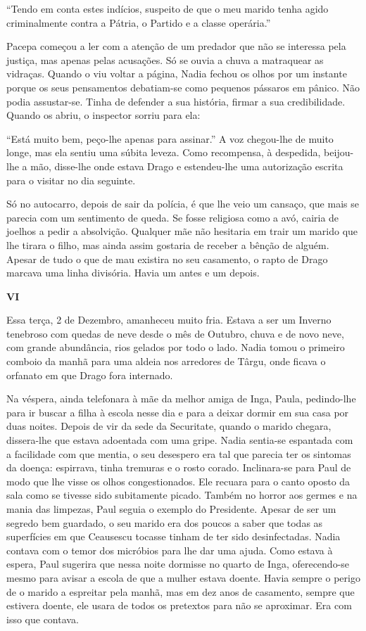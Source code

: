 ``Tendo em conta estes indícios, suspeito de que o meu marido tenha agido
criminalmente contra a Pátria, o Partido e a classe operária.''

Pacepa começou a ler com a atenção de um predador que não se interessa
pela justiça, mas apenas pelas acusações. Só se ouvia a chuva a
matraquear as vidraças. Quando o viu voltar a página, Nadia fechou os
olhos por um instante porque os seus pensamentos debatiam-se como
pequenos pássaros em pânico. Não podia assustar-se. Tinha de defender a sua história, firmar a sua credibilidade.
Quando os abriu, o inspector sorriu para ela:

``Está muito bem, peço-lhe apenas para assinar.'' A voz chegou-lhe de
muito longe, mas ela sentiu uma súbita leveza. Como recompensa, à
despedida, beijou-lhe a mão, disse-lhe onde estava Drago e estendeu-lhe
uma autorização escrita para o visitar no dia seguinte.

Só no autocarro, depois de sair da polícia, é que lhe veio um cansaço,
que mais se parecia com um sentimento de queda. Se fosse religiosa como
a avó, cairia de joelhos
a pedir a absolvição. Qualquer mãe não hesitaria em trair um marido que
lhe tirara o filho, mas ainda assim gostaria de receber a bênção de
alguém. Apesar de tudo o que de mau existira no seu casamento, o rapto
de Drago marcava uma linha divisória. Havia um antes e um depois.

\pagebreak
\vspace*{1.8cm}
\noindent{}\textbf{VI}

\bigskip

Essa terça, 2 de Dezembro, amanheceu muito fria. Estava a ser um Inverno
tenebroso com quedas de neve desde o mês de Outubro, chuva e de novo
neve, com grande abundância, rios gelados por todo o lado. Nadia tomou o
primeiro comboio da manhã para uma aldeia nos arredores de Târgu, onde
ficava o orfanato em que Drago fora internado.

Na véspera, ainda telefonara à mãe da melhor amiga de Inga, Paula,
pedindo-lhe para ir buscar a filha à escola nesse dia e para a deixar
dormir em sua casa por duas noites. Depois de vir da sede da Securitate,
quando o marido chegara, dissera-lhe que estava adoentada com uma gripe.
Nadia sentia-se espantada com a facilidade com que mentia, o seu
desespero era tal que parecia ter os sintomas da doença: espirrava,
tinha tremuras e o rosto corado. Inclinara-se para Paul de modo que lhe
visse os olhos congestionados. Ele recuara para o canto oposto da sala
como se tivesse sido subitamente picado. Também no horror aos germes e
na mania das limpezas, Paul seguia o exemplo do Presidente. Apesar de
ser um segredo bem
guardado, o seu marido era dos poucos a saber que todas as superfícies
em que Ceausescu tocasse tinham de ter sido desinfectadas. Nadia contava
com o temor dos micróbios para lhe dar uma ajuda. Como estava à espera,
Paul sugerira que nessa noite dormisse no quarto de Inga, oferecendo-se mesmo para avisar a escola de que a mulher estava doente. Havia
sempre o perigo de o marido a espreitar pela manhã, mas em dez anos de
casamento, sempre que estivera doente, ele usara de todos os pretextos
para não se aproximar. Era com isso que contava.

